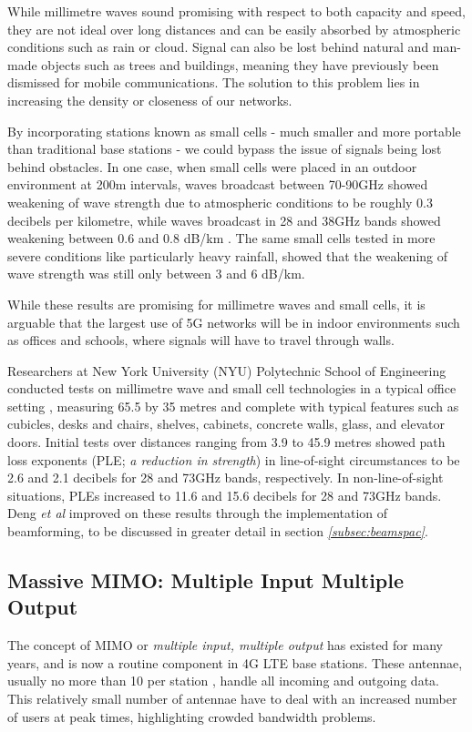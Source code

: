 \documentclass[journal]{IEEEtran}
\begin{document}
While millimetre waves sound promising with respect to both capacity and speed, they are not ideal over long distances and can be easily absorbed by atmospheric conditions such as rain or cloud. Signal can also be lost behind natural and man-made objects such as trees and buildings, meaning they have previously been dismissed for mobile communications. The solution to this problem lies in increasing the density or closeness of our networks. 

By incorporating stations known as small cells - much smaller and more portable than traditional base stations - we could bypass the issue of signals being lost behind obstacles. In one case, when small cells were placed in an outdoor environment at 200m intervals, waves broadcast between 70-90GHz showed weakening of wave strength due to atmospheric conditions to be roughly 0.3 decibels per kilometre, while waves broadcast in 28 and 38GHz bands showed weakening between 0.6 and 0.8 dB/km \cite{mmwave}. The same small cells tested in more severe conditions like particularly heavy rainfall, showed that the weakening of wave strength was still only between 3 and 6 dB/km. 

While these results are promising for millimetre waves and small cells, it is arguable that the largest use of 5G networks will be in indoor environments such as offices and schools, where signals will have to travel through walls. 

Researchers at New York University (NYU) Polytechnic School of Engineering conducted tests on millimetre wave and small cell technologies in a typical office setting \cite{28_73ghz}, measuring 65.5 by 35 metres and complete with typical features such as cubicles, desks and chairs, shelves, cabinets, concrete walls, glass, and elevator doors. Initial tests over distances ranging from 3.9 to 45.9 metres showed path loss exponents (PLE; \textit{a reduction in strength}) in line-of-sight circumstances to be 2.6 and 2.1 decibels for 28 and 73GHz bands, respectively. In non-line-of-sight situations, PLEs increased to 11.6 and 15.6 decibels for 28 and 73GHz bands. Deng \textit{et al} improved on these results through the implementation of beamforming, to be discussed in greater detail in section \textit{\ref{subsec:beamspac}}.

\subsection{Massive MIMO: Multiple Input Multiple Output}
The concept of MIMO or \textit{multiple input, multiple output} has existed for many years, and is now a routine component in 4G LTE base stations. These antennae, usually no more than 10 per station \cite{mimo}, handle all incoming and outgoing data. This relatively small number of antennae have to deal with an increased number of users at peak times, highlighting crowded bandwidth problems.
\end{document}
